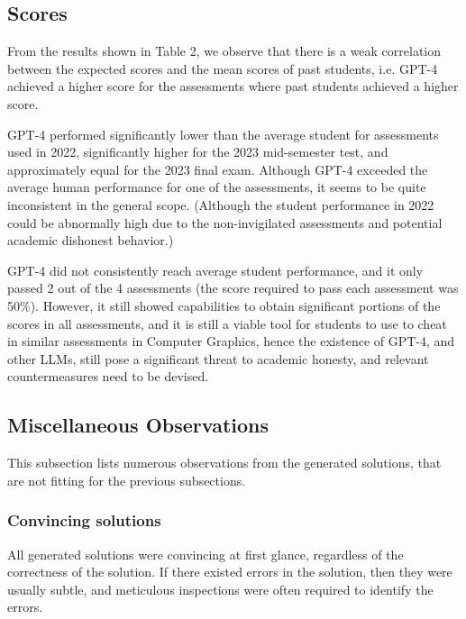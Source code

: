 \documentclass[sigconf,authordraft]{acmart}
\begin{document}
\subsection{Scores}
From the results shown in Table 2, we observe that there is a weak correlation between the expected scores and the mean scores of past students, i.e. GPT-4 achieved a higher score for the assessments where past students achieved a higher score.

GPT-4 performed significantly lower than the average student for assessments used in 2022, significantly higher for the 2023 mid-semester test, and approximately equal for the 2023 final exam. Although GPT-4 exceeded the average human performance for one of the assessments, it seems to be quite inconsistent in the general scope. (Although the student performance in 2022 could be abnormally high due to the non-invigilated assessments and potential academic dishonest behavior.)

GPT-4 did not consistently reach average student performance, and it only passed 2 out of the 4 assessments (the score required to pass each assessment was 50\%). However, it still showed capabilities to obtain significant portions of the scores in all assessments, and it is still a viable tool for students to use to cheat in similar assessments in Computer Graphics, hence the existence of GPT-4, and other LLMs, still pose a significant threat to academic honesty, and relevant countermeasures need to be devised.


\subsection{Miscellaneous Observations}
This subsection lists numerous observations from the generated solutions, that are not fitting for the previous subsections.

\subsubsection*{Convincing solutions}
All generated solutions were convincing at first glance, regardless of the correctness of the solution. If there existed errors in the solution, then they were usually subtle, and meticulous inspections were often required to identify the errors.
\end{document}

